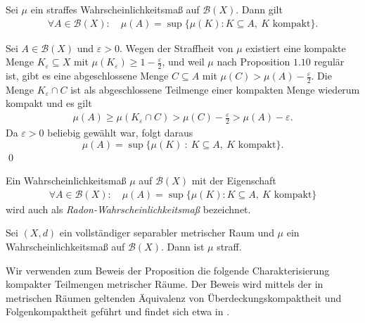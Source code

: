 \begin{corollary}
    Sei $\mu$ ein straffes Wahrscheinlichkeitsmaß auf $\mathcal{B}(X)$. Dann gilt
    \begin{align*}
        \forall A \in \mathcal{B}(X): \quad \mu(A) = \sup\{\mu(K): K \subseteq A,\ K \text{ kompakt}\}. 
    \end{align*}
\end{corollary}

\begin{proof*}
    Sei $A \in \mathcal{B}(X)$ und $\varepsilon > 0$. Wegen der Straffheit von $\mu$ existiert eine kompakte Menge $K_{\varepsilon} \subseteq X$ mit $\mu(K_{\varepsilon}) \geq 1 - \frac{\varepsilon}{2}$,
    und weil $\mu$ nach Proposition $1.10$ regulär ist, gibt es eine abgeschlossene Menge $C \subseteq A$ mit $\mu(C) > \mu(A) - \frac{\varepsilon}{2}$. 
    Die Menge $K_{\varepsilon} \cap C$ ist als abgeschlossene Teilmenge einer kompakten Menge wiederum kompakt und es gilt
    \begin{align*}
        \mu(A) \geq \mu(K_{\varepsilon} \cap C) > \mu(C) - \frac{\varepsilon}{2} > \mu(A) - \varepsilon. 
    \end{align*} 
    Da $\varepsilon > 0$ beliebig gewählt war, folgt daraus 
    $$
        \mu(A) = \sup\{\mu(K) \ : \ K \subseteq A, \ K \text{ kompakt} \}. 
    $$\qed
\end{proof*}

\begin{remark}
    Ein Wahrscheinlichkeitsmaß $\mu$ auf $\mathcal{B}(X)$ mit der Eigenschaft
    \begin{align*}
        \forall A \in \mathcal{B}(X): \quad \mu(A) = \sup\{\mu(K): K \subseteq A, \ K \text{ kompakt}\}
    \end{align*}
    wird auch als \textit{Radon-Wahrscheinlichkeitsmaß} bezeichnet.
\end{remark}

\begin{proposition}
    Sei $(X,d)$ ein vollständiger separabler metrischer Raum und $\mu$ ein Wahrscheinlichkeitsmaß auf $\mathcal{B}(X)$. Dann ist $\mu$ straff.
\end{proposition}

Wir verwenden zum Beweis der Proposition die folgende Charakterisierung kompakter Teilmengen metrischer Räume. 
Der Beweis wird mittels der in metrischen Räumen geltenden Äquivalenz von Überdeckungskompaktheit und Folgenkompaktheit  geführt und findet sich etwa in \cite[Theorem III.3.10]{amann}. 

